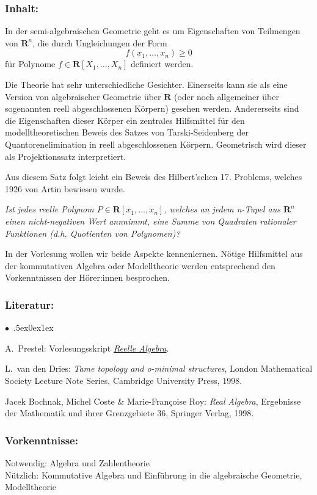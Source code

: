 \documentclass[a4paper,10pt]{article}
\renewenvironment{itemize}{\begin{list}{$\bullet$\ }{\itemsep.5ex\setlength{\topsep}{0.5\itemsep}\parsep0ex\labelsep1ex\settowidth{\labelwidth}{$\bullet$\ }\setlength{\leftmargin}{\labelwidth}\addtolength{\leftmargin}{3ex}\addtolength{\leftmargin}{\labelsep}}}{\end{list}}
\begin{document}
\subsubsection*{\large
    Inhalt:
}
In der semi-algebraischen Geometrie geht es um Eigenschaften von Teilmengen von $\textbf{R}^n$, die durch Ungleichungen der Form
\[ f(x_1,\dots,x_n)\geq 0\]
für Polynome $f\in\textbf{R}[X_1,\dots,X_n]$ definiert werden. 

Die Theorie hat sehr unterschiedliche Gesichter. Einerseits kann sie als eine Version von algebraischer Geometrie über $\mathbf{R}$ (oder noch allgemeiner über sogenannten reell abgeschlossenen Körpern) gesehen werden. Andererseits sind die Eigenschaften dieser Körper ein zentrales Hilfsmittel für den modelltheoretischen Beweis des Satzes von Tarski-Seidenberg der Quantorenelimination in reell abgeschlossenen Körpern. Geometrisch wird dieser als Projektionssatz interpretiert.

Aus diesem Satz folgt leicht ein Beweis des Hilbert’schen 17. Problems, welches 1926 von Artin bewiesen wurde. 

\textit{Ist jedes reelle Polynom $P \in \mathbf{R}[x_1 ,\dots , x_n ]$, welches an jedem n-Tupel aus $\mathbf{R}^n$ einen nicht-negativen Wert annnimmt, eine Summe von Quadraten rationaler Funktionen (d.h. Quotienten von Polynomen)?}

In der Vorlesung wollen wir beide Aspekte kennenlernen. Nötige Hilfsmittel aus der kommutativen Algebra oder Modelltheorie werden entsprechend den Vorkenntnissen der Hörer:innen besprochen. 
\subsubsection*{\large
    Literatur:
}
\begin{itemize}
\item A.~Prestel: Vorlesungsskript \href{http://www.math.uni-konstanz.de/\~prestel/raskript.pdf}{\emph{Reelle Algebra}}.
\item
L.~van den Dries: \emph{Tame topology and o-minimal structures}, London Mathematical Society Lecture Note Series, Cambridge University Press, 1998. 
\item
Jacek Bochnak, Michel Coste \& Marie-Françoise Roy: \emph{Real Algebra}, Ergebnisse der Mathematik und ihrer Grenzgebiete 36, Springer Verlag, 1998.
\end{itemize}
\subsubsection*{\large
    Vorkenntnisse:
}
Notwendig: Algebra und Zahlentheorie \\
Nützlich: Kommutative Algebra und Einführung in die algebraische Geometrie, Modelltheorie
\cleardoublepage
\end{document}
